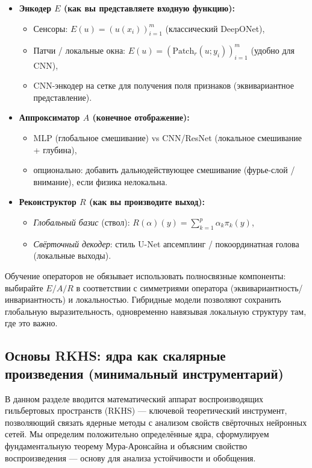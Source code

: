 \documentclass[../NDCNNAI_main.tex]{subfiles}
\begin{document}
\begin{itemize}
    \item \textbf{Энкодер $E$ (как вы представляете входную функцию):}
    \begin{itemize}
        \item Сенсоры: $E(u) = (u(x_i))_{i=1}^m$ (классический DeepONet),
        \item Патчи / локальные окна: $E(u) = (\text{Patch}_r(u; y_i))_{i=1}^m$ (удобно для CNN),
        \item CNN-энкодер на сетке для получения поля признаков (эквивариантное представление).
    \end{itemize}
    
    \item \textbf{Аппроксиматор $A$ (конечное отображение):}
    \begin{itemize}
        \item MLP (глобальное смешивание) vs CNN/ResNet (локальное смешивание + глубина),
        \item опционально: добавить дальнодействующее смешивание (фурье-слой / внимание), если физика нелокальна.
    \end{itemize}
    
    \item \textbf{Реконструктор $R$ (как вы производите выход):}
    \begin{itemize}
        \item \emph{Глобальный базис} (ствол): $R(\alpha)(y) = \sum_{k=1}^p \alpha_k \pi_k(y)$,
        \item \emph{Свёрточный декодер}: стиль U-Net апсемплинг / покоординатная голова (локальные выходы).
    \end{itemize}
\end{itemize}

\begin{remark}
    Обучение операторов не обязывает использовать полносвязные компоненты: выбирайте $E/A/R$ в соответствии с симметриями оператора (эквивариантность/инвариантность) и локальностью. Гибридные модели позволяют сохранить глобальную выразительность, одновременно навязывая локальную структуру там, где это важно.    
\end{remark}

\subsection{Основы RKHS: ядра как скалярные произведения (минимальный инструментарий)}
В данном разделе вводится математический аппарат воспроизводящих гильбертовых пространств (RKHS) --- ключевой теоретический инструмент, позволяющий связать ядерные методы с анализом свойств свёрточных нейронных сетей. Мы определим положительно определённые ядра, сформулируем фундаментальную теорему Мура-Аронсайна и объясним свойство воспроизведения --- основу для анализа устойчивости и обобщения.
\end{document}
